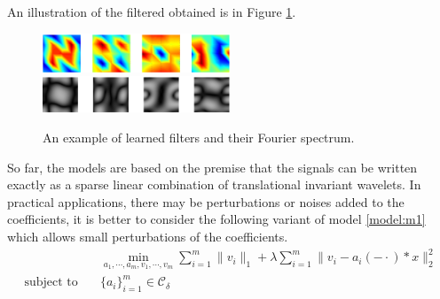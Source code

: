 \documentclass[a4paper]{article}
\begin{document}

An illustration of the filtered obtained is in Figure \ref{fig:1}.
\begin{figure}[h!]
    \centering
    \includegraphics[width=0.5\textwidth]{fig11.eps}
  \includegraphics[width=0.5\textwidth]{fig12.eps}
    \caption{An example of learned filters and their Fourier spectrum.}
    \label{fig:1}
\end{figure}

So far, the models are based on the premise that the signals can be written exactly as a sparse linear combination of translational invariant wavelets. In practical applications, there may be perturbations or noises added to the coefficients, it is better to consider the following variant of model \eqref{model:m1} which allows small perturbations of the coefficients.
\begin{equation}
\label{model:m3}
\begin{aligned}
	&\min_{a_1,\cdots,a_m,v_1,\cdots,v_m} \sum_{i=1}^m \|v_i\|_1  + \lambda \sum_{i=1}^m \|v_i - a_i(-\cdot)*x\|_2^2\\
	\textrm{subject to} \quad& \{a_i\}_{i=1}^m \in \mathcal{C_\delta} \\		 
\end{aligned}
\end{equation}
\end{document}
